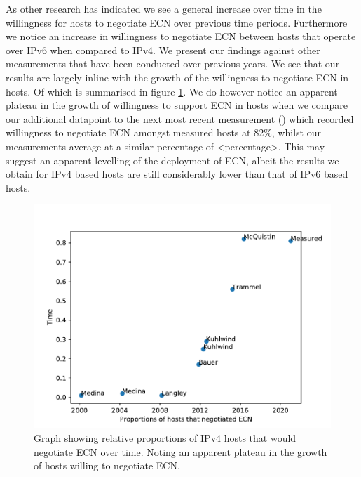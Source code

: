 \documentclass{l4proj}
\begin{document}
As other research has indicated we see a general increase over time in the willingness for hosts to negotiate ECN over previous time periods. Furthermore we notice an increase in willingness to negotiate ECN between hosts that operate over IPv6 when compared to IPv4.  We present our findings against other measurements that have been conducted over previous years. We see that our results are largely inline with the growth of the willingness to negotiate ECN in hosts. Of which is summarised in figure \ref{fig:ecngrowth}. We do however notice an apparent plateau in the growth of willingness to support ECN in hosts when we compare our additional datapoint to the next most recent measurement (\cite{mcquistin_is_2015}) which recorded willingness to negotiate ECN amongst measured hosts at 82\%, whilst our measurements average at a similar percentage of <percentage>. This may suggest an apparent levelling of the deployment of ECN, albeit the results we obtain for IPv4 based hosts are still considerably lower than that of IPv6 based hosts.

\begin{figure}[H]
    \centering
    \includegraphics[scale=0.7]{dissertation/images/ecn_trends.pdf}
    \caption{Graph showing relative proportions of IPv4 hosts that would negotiate ECN over time. Noting an apparent plateau in the growth of hosts willing to negotiate ECN.}
    \label{fig:ecngrowth}
\end{figure}

\end{document}

